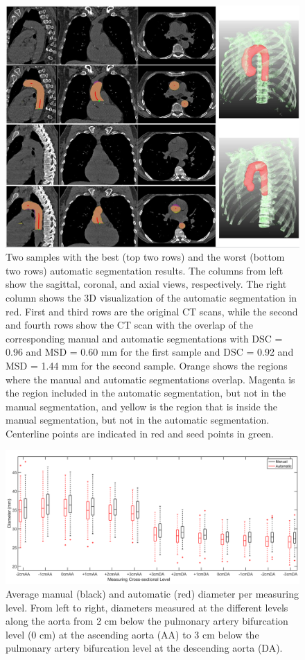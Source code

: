 \begin{figure}
\centering
\includegraphics[width=\textwidth]{Figures/Figure3.JPG}
\caption{Two samples with the best (top two rows) and the worst (bottom two rows) automatic segmentation results. The columns from left show the sagittal, coronal, and axial views, respectively. The right column shows the 3D visualization of the automatic segmentation in red. First and third rows are the original CT scans, while the second and fourth rows show the CT scan with the overlap of the corresponding manual and automatic segmentations with DSC = 0.96 and MSD = 0.60 mm for the first sample and DSC = 0.92 and MSD = 1.44 mm for the second sample. Orange shows the regions where the manual and automatic segmentations overlap. Magenta is the region included in the automatic segmentation, but not in the manual segmentation, and yellow is the region that is inside the manual segmentation, but not in the automatic segmentation. Centerline points are indicated in red and seed points in green.}
\label{fig:segmentation_Sample}
\end{figure}

\begin{figure}
\centering
\includegraphics[width=\textwidth]{Figures/Figure4.jpg}
\caption{Average manual (black) and automatic (red) diameter per measuring level. From left to right, diameters measured at the different levels along the aorta from 2 cm below the pulmonary artery bifurcation level (0 cm) at the ascending aorta (AA) to 3 cm below the pulmonary artery
bifurcation level at the descending aorta (DA).}
\label{fig:Boxplot_Diameter}
\end{figure}


